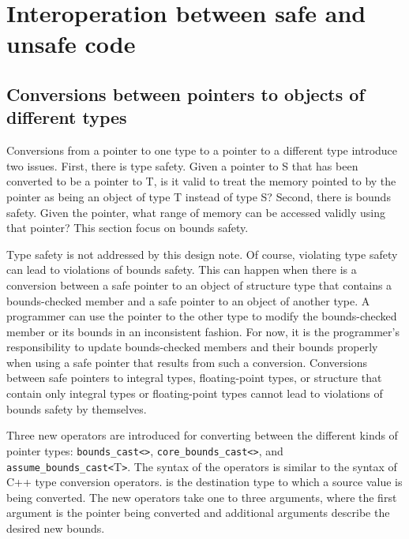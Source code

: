 
\chapter{Interoperation between safe and unsafe code}
\label{chapter:interoperation}

\section{Conversions between pointers to objects of different types}
\label{conversions-between-pointers-to-objects-of-different-types}

Conversions from a pointer to one type to a pointer to a different type
introduce two issues. First, there is type safety. Given a pointer to S
that has been converted to be a pointer to T, is it valid to treat the
memory pointed to by the pointer as being an object of type T instead of
type S? Second, there is bounds safety. Given the pointer, what range of
memory can be accessed validly using that pointer? This section focus on
bounds safety.

Type safety is not addressed by this design note. Of course, violating
type safety can lead to violations of bounds safety. This can happen
when there is a conversion between a safe pointer to an object of
structure type that contains a bounds-checked member and a safe pointer
to an object of another type. A programmer can use the pointer to the
other type to modify the bounds-checked member or its bounds in an
inconsistent fashion. For now, it is the programmer's responsibility to
update bounds-checked members and their bounds properly when using a
safe pointer that results from such a conversion. Conversions between
safe pointers to integral types, floating-point types, or structure that
contain only integral types or floating-point types cannot lead to
violations of bounds safety by themselves.

Three new operators are introduced for converting between the different
kinds of pointer types:
\texttt{bounds\_cast\textless{}}\texttt{\textgreater{}},
\texttt{core\_bounds\_cast\textless{}}\texttt{\textgreater{}},
and \texttt{assume\_bounds\_cast\textless{}}T\texttt{\textgreater{}}.
The syntax of the operators is similar to the syntax of C++ type
conversion operators.  is the destination type to which a source
value is being converted. The new operators take one to three arguments,
where the first argument is the pointer being converted and additional
arguments describe the desired new bounds.

